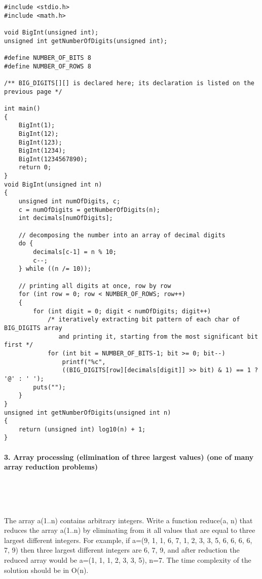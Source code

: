 \documentclass{article}
\begin{document}
	\begin{verbatim}
#include <stdio.h>
#include <math.h>

void BigInt(unsigned int);
unsigned int getNumberOfDigits(unsigned int);

#define NUMBER_OF_BITS 8
#define NUMBER_OF_ROWS 8

/** BIG_DIGITS[][] is declared here; its declaration is listed on the previous page */

int main() 
{
    BigInt(1);
    BigInt(12);
    BigInt(123);
    BigInt(1234);
    BigInt(1234567890);
    return 0;
}
void BigInt(unsigned int n)
{
    unsigned int numOfDigits, c;
    c = numOfDigits = getNumberOfDigits(n);
    int decimals[numOfDigits];

    // decomposing the number into an array of decimal digits
    do {
        decimals[c-1] = n % 10;
        c--;
    } while ((n /= 10));

    // printing all digits at once, row by row
    for (int row = 0; row < NUMBER_OF_ROWS; row++)
    {
        for (int digit = 0; digit < numOfDigits; digit++)
            /* iteratively extracting bit pattern of each char of BIG_DIGITS array
               and printing it, starting from the most significant bit first */
            for (int bit = NUMBER_OF_BITS-1; bit >= 0; bit--)
                printf("%c", 
                ((BIG_DIGITS[row][decimals[digit]] >> bit) & 1) == 1 ? '@' : ' ');
        puts("");
    }
}
unsigned int getNumberOfDigits(unsigned int n) 
{
    return (unsigned int) log10(n) + 1;
}
	\end{verbatim}
	

	
	\rmfamily
	
	\paragraph{3. Array processing (elimination of three largest values) (one of many array reduction problems) }\
	
	\rmfamily\
	
		The array a(1..n) contains arbitrary integers. Write a function reduce(a, n) that reduces the array a(1..n) by eliminating from it all values that are equal to three largest different integers. For example, if a=(9, 1, 1, 6, 7, 1, 2, 3, 3, 5, 6, 6, 6, 6, 7, 9) then three largest different integers are 6, 7, 9, and after reduction the reduced array would be a=(1, 1, 1, 2, 3, 3, 5), n=7. The time complexity of the solution should be in O(n). 
		\newline
		
\end{document}
